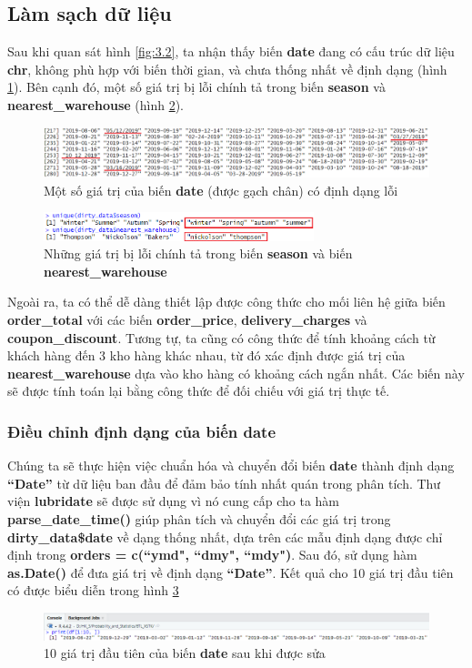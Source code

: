 \subsection{Làm sạch dữ liệu}
Sau khi quan sát hình \ref{fig:3.2}, ta nhận thấy biến \textbf{date} đang có cấu trúc dữ liệu \textbf{chr}, không phù hợp với biến thời gian, và chưa thống nhất về định dạng (hình \ref{fig:3.3}). Bên cạnh đó, một số giá trị bị lỗi chính tả trong biến \textbf{season} và \textbf{nearest\_warehouse} (hình \ref{fig:3.4}).
\begin{figure}[!htbp]
    \centering
    \includegraphics[width=1\textwidth]{graphics/Pre_processing_data/f10.PNG}
    \caption{Một số giá trị của biến \textbf{date} (được gạch chân) có định dạng lỗi}
    \label{fig:3.3}
\end{figure}

\begin{figure}[!htbp]
    \centering
    \includegraphics[width=0.7\textwidth]{graphics/Pre_processing_data/f11.PNG}
    \caption{Những giá trị bị lỗi chính tả trong biến \textbf{season} và biến \textbf{nearest\_warehouse}}
    \label{fig:3.4}
\end{figure}

Ngoài ra, ta có thể dễ dàng thiết lập được công thức cho mối liên hệ giữa biến \textbf{order\_total} với các biến \textbf{order\_price}, \textbf{delivery\_charges} và \textbf{coupon\_discount}. Tương tự, ta cũng có công thức để tính khoảng cách từ khách hàng đến 3 kho hàng khác nhau, từ đó xác định được giá trị của \textbf{nearest\_warehouse} dựa vào kho hàng có khoảng cách ngắn nhất. Các biến này sẽ được tính toán lại bằng công thức để đối chiếu với giá trị thực tế.
\subsubsection{Điều chỉnh định dạng của biến date}
Chúng ta sẽ thực hiện việc chuẩn hóa và chuyển đổi biến \textbf{date} thành định dạng \textbf{``Date''} từ dữ liệu ban đầu để đảm bảo tính nhất quán trong phân tích. Thư viện \textbf{lubridate} sẽ được sử dụng vì nó cung cấp cho ta hàm \textbf{parse\_date\_time()} giúp phân tích và chuyển đổi các giá trị trong \textbf{dirty\_data\$date} về dạng thống nhất, dựa trên các mẫu định dạng được chỉ định trong \textbf{orders = c(``ymd", ``dmy", ``mdy")}. Sau đó, sử dụng hàm \textbf{as.Date()} để đưa giá trị về định dạng \textbf{``Date''}. Kết quả cho 10 giá trị đầu tiên có được biểu diễn trong hình \ref{f2}
\begin{figure}[!htbp]
    \centering
    \includegraphics[width=\textwidth]{graphics/Pre_processing_data/f2.PNG}
    \caption{10 giá trị đầu tiên của biến \textbf{date} sau khi được sửa}
    \label{f2}
\end{figure} 

